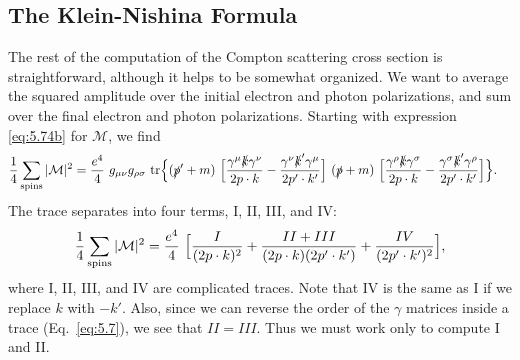 \subsection{The Klein-Nishina Formula}

The rest of the computation of the Compton scattering cross section is
straightforward, although it helps to be somewhat organized.  We want to
average the squared amplitude over the initial electron and photon
polarizations, and sum over the final electron and photon polarizations.
Starting with expression \eqref{eq:5.74b} for $\mathcal{M}$, we find
\begin{equation}
  \begin{aligned}
    \frac{1}{4}\sum_{\text{spins}}|\mathcal{M}|^2
    &= \frac{e^4}{4}\ g_{\mu\nu}g_{\rho\sigma}\ \mathrm{tr}\Bigl\{
      (\slashed{p}'+m)\ \Bigl[
        \frac{\gamma^\mu\slashed{k}\gamma^\nu}{2p\cdot k}
        - \frac{\gamma^\nu\slashed{k}'\gamma^\mu}{2p'\cdot k'} \Bigr]\
      (\slashed{p}+m)\ \Bigl[
        \frac{\gamma^\rho\slashed{k}\gamma^\sigma}{2p\cdot k}
        - \frac{\gamma^\sigma\slashed{k}'\gamma^\rho}{2p'\cdot k'} \Bigr]
      \Bigr\} .
  \end{aligned}
  \label{eq:5.82}
\end{equation}
The trace separates into four terms, I, II, III, and IV:
\begin{equation}
  \frac{1}{4}\sum_{\text{spins}}|\mathcal{M}|^2
    = \frac{e^4}{4}\ \Bigl[ \frac{I}{(2p\cdot k)^2}
      + \frac{II + III}{(2p\cdot k)(2p'\cdot k')}
      + \frac{IV}{(2p'\cdot k')^2} \Bigr],
  \label{eq:5.83}
\end{equation}
where I, II, III, and IV are complicated traces.  Note that IV is the same as
I if we replace $k$ with $-k'$.  Also, since we can reverse the order of the
$\gamma$ matrices inside a trace (Eq.~\eqref{eq:5.7}), we see that
$II = III$.  Thus we must work only to compute I and II.

